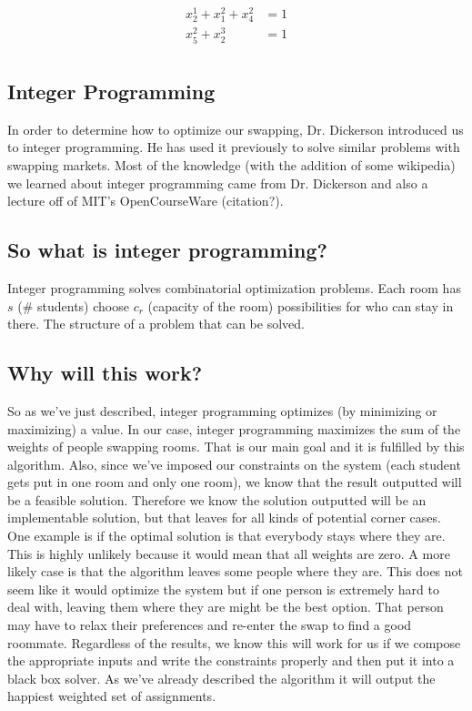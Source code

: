\documentclass[12pt]{article}
\begin{document}
\begin{align*}
x_2^1+x_1^2+x_4^2&=1\\
x_5^2+x_2^3&=1\\
\end{align*}

\begin{multicols}{2}

\section{Integer Programming}
In order to determine how to optimize our swapping, Dr. Dickerson introduced us to integer programming. He has used it previously to solve similar problems with swapping markets. Most of the knowledge (with the addition of some wikipedia) we learned about integer programming came from Dr. Dickerson and also a lecture off of MIT's OpenCourseWare (citation?).

\subsection{So what is integer programming?}
Integer programming solves combinatorial optimization problems. Each room has $s$ (\# students) choose $c_r$ (capacity of the room) possibilities for who can stay in there. The structure of a problem that can be solved. 

\subsection{Why will this work?}
So as we've just described, integer programming optimizes (by minimizing or maximizing) a value. In our case, integer programming maximizes the sum of the weights of people swapping rooms. That is our main goal and it is fulfilled by this algorithm. Also, since we've imposed our constraints on the system (each student gets put in one room and only one room), we know that the result outputted will be a feasible solution. Therefore we know the solution outputted will be an implementable solution, but that leaves for all kinds of potential corner cases. One example is if the optimal solution is that everybody stays where they are. This is highly unlikely because it would mean that all weights are zero. A more likely case is that the algorithm leaves some people where they are. This does not seem like it would optimize the system but if one person is extremely hard to deal with, leaving them where they are might be the best option. That person may have to relax their preferences and re-enter the swap to find a good roommate. Regardless of the results, we know this will work for us if we compose the appropriate inputs and write the constraints properly and then put it into a black box solver. As we've already described the algorithm it will output the happiest weighted set of assignments.


\end{multicols}
\end{document}
